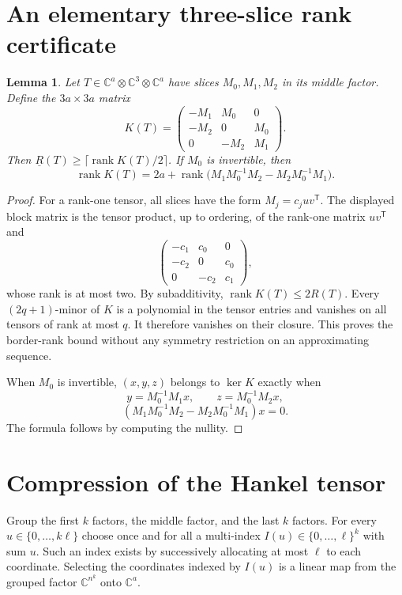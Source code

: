 \documentclass[11pt]{article}
\newtheorem{lemma}[theorem]{Lemma}
\newcommand{\C}{\mathbb C}
\newcommand{\brk}{\underline{R}}
\DeclareMathOperator{\rank}{rank}
\begin{document}
\section{An elementary three-slice rank certificate}
\begin{lemma}\label{lem:koszul}
Let $T\in\C^a\otimes\C^3\otimes\C^a$ have slices $M_0,M_1,M_2$ in
its middle factor. Define the $3a\times3a$ matrix
\[
 K(T)=\begin{pmatrix}
 -M_1&M_0&0\\
 -M_2&0&M_0\\
 0&-M_2&M_1
 \end{pmatrix}.
\]
Then $\brk(T)\ge\lceil\rank K(T)/2\rceil$.
If $M_0$ is invertible, then
\[
 \rank K(T)=2a+
 \rank\bigl(M_1M_0^{-1}M_2-M_2M_0^{-1}M_1\bigr).
\]
\end{lemma}
\begin{proof}
For a rank-one tensor, all slices have the form
$M_j=c_j u v^{\mathsf T}$. The displayed block matrix is the tensor
product, up to ordering, of the rank-one matrix $uv^{\mathsf T}$ and
\[
 \begin{pmatrix}-c_1&c_0&0\\-c_2&0&c_0\\0&-c_2&c_1\end{pmatrix},
\]
whose rank is at most two. By subadditivity, $\rank K(T)\le2R(T)$.
Every $(2q+1)$-minor of $K$ is a polynomial in the tensor entries and
vanishes on all tensors of rank at most $q$. It therefore vanishes on
their closure. This proves the border-rank bound without any symmetry
restriction on an approximating sequence.

When $M_0$ is invertible, $(x,y,z)$ belongs to $\ker K$ exactly when
\[
 y=M_0^{-1}M_1x,\qquad z=M_0^{-1}M_2x,
\]
\[
 (M_1M_0^{-1}M_2-M_2M_0^{-1}M_1)x=0.
\]
The formula follows by computing the nullity.
\end{proof}

\section{Compression of the Hankel tensor}
Group the first $k$ factors, the middle factor, and the last $k$ factors.
For every $u\in\{0,\ldots,k\ell\}$ choose once and for all a multi-index
$I(u)\in\{0,\ldots,\ell\}^{k}$ with sum $u$. Such an index exists by
successively allocating at most $\ell$ to each coordinate. Selecting the
coordinates indexed by $I(u)$ is a linear map from the grouped factor
$\C^{n^k}$ onto $\C^a$.
\end{document}
